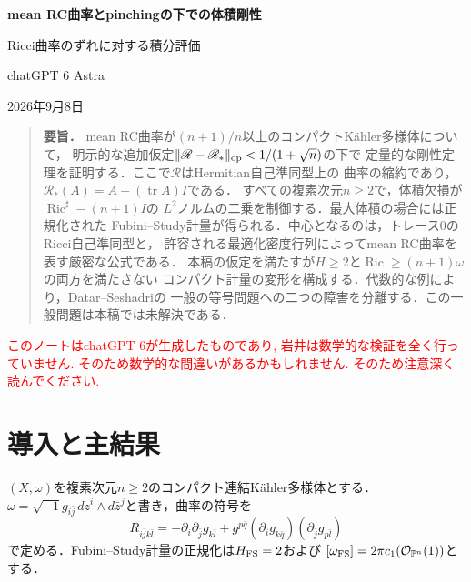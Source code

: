 \documentclass[12pt]{amsart}
\theoremstyle{definition}
\theoremstyle{remark}
\numberwithin{equation}{section}
\DeclareMathOperator{\Ric}{Ric}
\DeclareMathOperator{\tr}{tr}
\newcommand{\cO}{\mathcal{O}}
\newcommand{\xr}[1]{\textcolor{red}{#1}}
\theoremstyle{plain}
\theoremstyle{remark}
\theoremstyle{definition}
\begin{document}
\newpage
\setcounter{section}{0}
\setcounter{thm}{0}
\setcounter{equation}{0}
\renewcommand{\theHsection}{ja.\arabic{section}}
\renewcommand{\theHthm}{ja.\thesection.\arabic{thm}}
\renewcommand{\theHequation}{ja.\thesection.\arabic{equation}}
\renewcommand{\proofname}{証明}
\renewcommand{\refname}{参考文献}
\begin{center}
{\large\bfseries mean RC曲率とpinchingの下での体積剛性\par
Ricci曲率のずれに対する積分評価}\par\medskip
chatGPT 6 Astra\par\smallskip
2026年9月8日
\end{center}
\begin{quote}\small
\textbf{要旨．}
mean RC曲率が$(n+1)/n$以上のコンパクトK\"ahler多様体について，
明示的な追加仮定$\|\mathscr R-\mathscr R_*\|_{\rm op}<1/(1+\sqrt n)$の下で
定量的な剛性定理を証明する．ここで$\mathscr R$はHermitian自己準同型上の
曲率の縮約であり，$\mathscr R_*(A)=A+(\tr A)I$である．
すべての複素次元$n\geq2$で，体積欠損が$\Ric^\sharp-(n+1)I$の
$L^2$ノルムの二乗を制御する．最大体積の場合には正規化された
Fubini--Study計量が得られる．中心となるのは，トレース0のRicci自己準同型と，
許容される最適化密度行列によってmean RC曲率を表す厳密な公式である．
本稿の仮定を満たすが$H\geq2$と$\Ric\geq(n+1)\omega$の両方を満たさない
コンパクト計量の変形を構成する．代数的な例により，Datar--Seshadriの
一般の等号問題への二つの障害を分離する．この一般問題は本稿では未解決である．
\end{quote}

\xr{このノートはchatGPT 6が生成したものであり, 岩井は数学的な検証を全く行っていません. そのため数学的な間違いがあるかもしれません. そのため注意深く読んでください.}
\section{導入と主結果}

$(X,\omega)$を複素次元$n\geq2$のコンパクト連結K\"ahler多様体とする．
$\omega=\sqrt{-1}g_{i\bar j}\,dz^i\wedge d\bar z^j$と書き，曲率の符号を
\[
 R_{i\bar j k\bar l}=-\partial_i\partial_{\bar j}g_{k\bar l}
 +g^{p\bar q}(\partial_i g_{k\bar q})(\partial_{\bar j}g_{p\bar l})
\]
で定める．Fubini--Study計量の正規化は$H_{\rm FS}=2$および
$[\omega_{\rm FS}]=2\pi c_1(\cO_{\mathbb P^n}(1))$とする．
\end{document}

